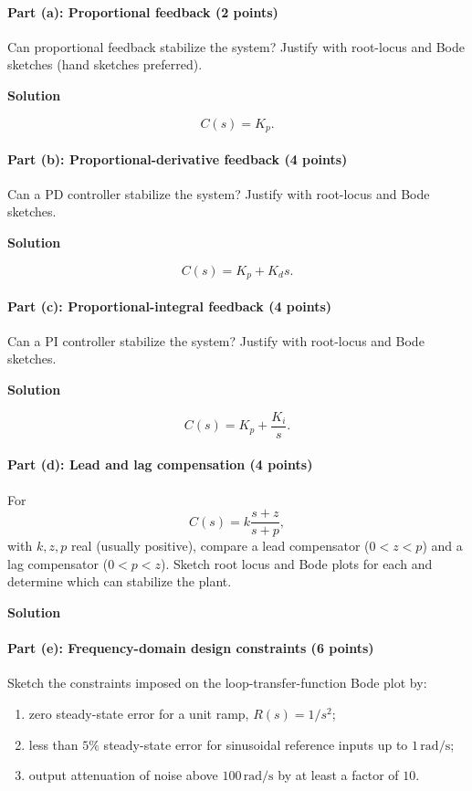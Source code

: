 \documentclass[11pt]{article}
\begin{document}
\paragraph{Part (a): Proportional feedback (2 points)}
Can proportional feedback stabilize the system? Justify with root-locus and Bode sketches (hand sketches preferred).

\textbf{Solution}\par
\[
C(s)=K_p.
\]

\paragraph{Part (b): Proportional-derivative feedback (4 points)}
Can a PD controller stabilize the system? Justify with root-locus and Bode sketches.

\textbf{Solution}\par
\[
C(s)=K_p+K_d s.
\]

\paragraph{Part (c): Proportional-integral feedback (4 points)}
Can a PI controller stabilize the system? Justify with root-locus and Bode sketches.

\textbf{Solution}\par
\[
C(s)=K_p+\frac{K_i}{s}.
\]

\paragraph{Part (d): Lead and lag compensation (4 points)}
For
\[
C(s)=k\frac{s+z}{s+p},
\]
with $k,z,p$ real (usually positive), compare a lead compensator ($0<z<p$) and a lag compensator ($0<p<z$). Sketch root locus and Bode plots for each and determine which can stabilize the plant.

\textbf{Solution}\par

\paragraph{Part (e): Frequency-domain design constraints (6 points)}
Sketch the constraints imposed on the loop-transfer-function Bode plot by:
\begin{enumerate}
    \item[(i)] zero steady-state error for a unit ramp, $R(s)=1/s^2$;
    \item[(ii)] less than $5\%$ steady-state error for sinusoidal reference inputs up to $1\,\mathrm{rad/s}$;
    \item[(iii)] output attenuation of noise above $100\,\mathrm{rad/s}$ by at least a factor of $10$.
\end{enumerate}
\end{document}
